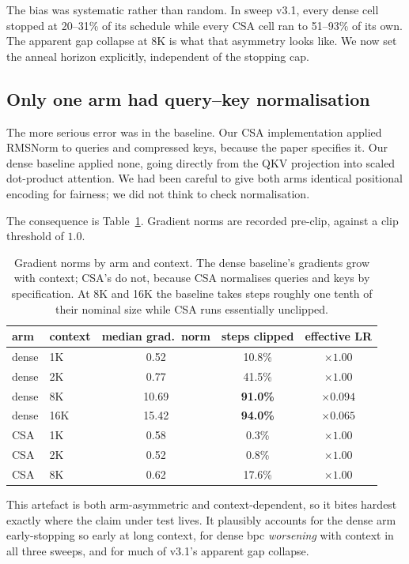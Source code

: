 \documentclass[11pt]{article}
\begin{document}
The bias was systematic rather than random. In sweep v3.1, every dense cell
stopped at 20--31\% of its schedule while every CSA cell ran to 51--93\% of
its own. The apparent gap collapse at 8K is what that asymmetry looks like.
We now set the anneal horizon explicitly, independent of the stopping cap.

\subsection{Only one arm had query--key normalisation}
\label{sec:qknorm}

The more serious error was in the baseline. Our CSA implementation applied
RMSNorm to queries and compressed keys, because the paper specifies it. Our
dense baseline applied none, going directly from the QKV projection into
scaled dot-product attention. We had been careful to give both arms identical
positional encoding for fairness; we did not think to check normalisation.

The consequence is Table~\ref{tab:qknorm}. Gradient norms are recorded
pre-clip, against a clip threshold of $1.0$.

\begin{table}[t]
\centering
\small
\begin{tabular}{llccc}
\toprule
arm & context & median grad.\ norm & steps clipped & effective LR \\
\midrule
dense & 1K  & 0.52 & 10.8\% & $\times 1.00$ \\
dense & 2K  & 0.77 & 41.5\% & $\times 1.00$ \\
dense & 8K  & 10.69 & \textbf{91.0\%} & $\mathbf{\times 0.094}$ \\
dense & 16K & 15.42 & \textbf{94.0\%} & $\mathbf{\times 0.065}$ \\
\midrule
CSA & 1K & 0.58 & 0.3\%  & $\times 1.00$ \\
CSA & 2K & 0.52 & 0.8\%  & $\times 1.00$ \\
CSA & 8K & 0.62 & 17.6\% & $\times 1.00$ \\
\bottomrule
\end{tabular}
\caption{Gradient norms by arm and context. The dense baseline's gradients grow
with context; CSA's do not, because CSA normalises queries and keys by
specification. At 8K and 16K the baseline takes steps roughly one tenth of
their nominal size while CSA runs essentially unclipped.}
\label{tab:qknorm}
\end{table}

This artefact is both arm-asymmetric and context-dependent, so it bites hardest
exactly where the claim under test lives. It plausibly accounts for the dense
arm early-stopping so early at long context, for dense bpc \emph{worsening}
with context in all three sweeps, and for much of v3.1's apparent gap collapse.
\end{document}
